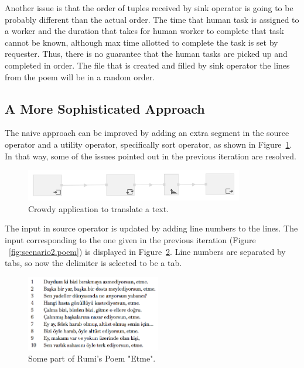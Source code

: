 Another issue is that the order of tuples received by sink operator is going to be probably different than the actual order. The time that human task is assigned to a worker and the duration that takes for human worker to complete that task cannot be known, although max time allotted to complete the task is set by requester. Thus, there is no guarantee that the human tasks are picked up and completed in order. The file that is created and filled by sink operator the lines from the poem will be in a random order.

\subsection{A More Sophisticated Approach}
The naive approach can be improved by adding an extra segment in the source operator and a utility operator, specifically sort operator, as shown in Figure~\ref{fig:scenario2.1}. In that way, some of the issues pointed out in the previous iteration are resolved.

\begin{figure}[ht]
	\centering
	\includegraphics[width=0.85\textwidth]{figures/scenarios/scenario2_1.png}
	\caption{Crowdy application to translate a text.}
	\label{fig:scenario2.1}
\end{figure}

The input in source operator is updated by adding line numbers to the lines. The input corresponding to the one given in the previous iteration (Figure ~\ref{fig:scenario2.poem}) is displayed in Figure~\ref{fig:scenario2.poem2}. Line numbers are separated by tabs, so now the delimiter is selected to be a tab.

\begin{figure}[ht]
	\centering
	\includegraphics[height=125px]{figures/scenarios/poem2.png}
	\caption{Some part of Rumi's Poem "Etme".}
	\label{fig:scenario2.poem2}
\end{figure}

